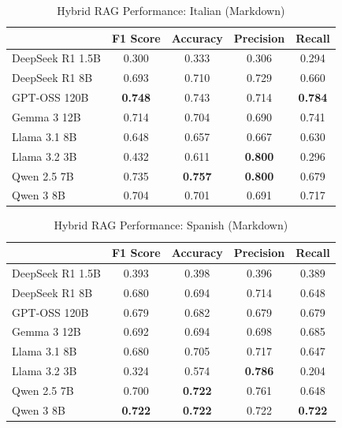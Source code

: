 \begin{table}[!htbp]
\caption{Hybrid RAG Performance: Italian (Markdown)}
\label{tab:hybrid_italian_md}
\begin{tabular}{lcccc}
\toprule
 & F1 Score & Accuracy & Precision & Recall \\
\midrule
DeepSeek R1 1.5B & 0.300 & 0.333 & 0.306 & 0.294 \\
DeepSeek R1 8B & 0.693 & 0.710 & 0.729 & 0.660 \\
GPT-OSS 120B & \textbf{0.748} & 0.743 & 0.714 & \textbf{0.784} \\
Gemma 3 12B & 0.714 & 0.704 & 0.690 & 0.741 \\
Llama 3.1 8B & 0.648 & 0.657 & 0.667 & 0.630 \\
Llama 3.2 3B & 0.432 & 0.611 & \textbf{0.800} & 0.296 \\
Qwen 2.5 7B & 0.735 & \textbf{0.757} & \textbf{0.800} & 0.679 \\
Qwen 3 8B & 0.704 & 0.701 & 0.691 & 0.717 \\
\bottomrule
\end{tabular}
\end{table}


\begin{table}[!htbp]
\caption{Hybrid RAG Performance: Spanish (Markdown)}
\label{tab:hybrid_spanish_md}
\begin{tabular}{lcccc}
\toprule
 & F1 Score & Accuracy & Precision & Recall \\
\midrule
DeepSeek R1 1.5B & 0.393 & 0.398 & 0.396 & 0.389 \\
DeepSeek R1 8B & 0.680 & 0.694 & 0.714 & 0.648 \\
GPT-OSS 120B & 0.679 & 0.682 & 0.679 & 0.679 \\
Gemma 3 12B & 0.692 & 0.694 & 0.698 & 0.685 \\
Llama 3.1 8B & 0.680 & 0.705 & 0.717 & 0.647 \\
Llama 3.2 3B & 0.324 & 0.574 & \textbf{0.786} & 0.204 \\
Qwen 2.5 7B & 0.700 & \textbf{0.722} & 0.761 & 0.648 \\
Qwen 3 8B & \textbf{0.722} & \textbf{0.722} & 0.722 & \textbf{0.722} \\
\bottomrule
\end{tabular}
\end{table}
